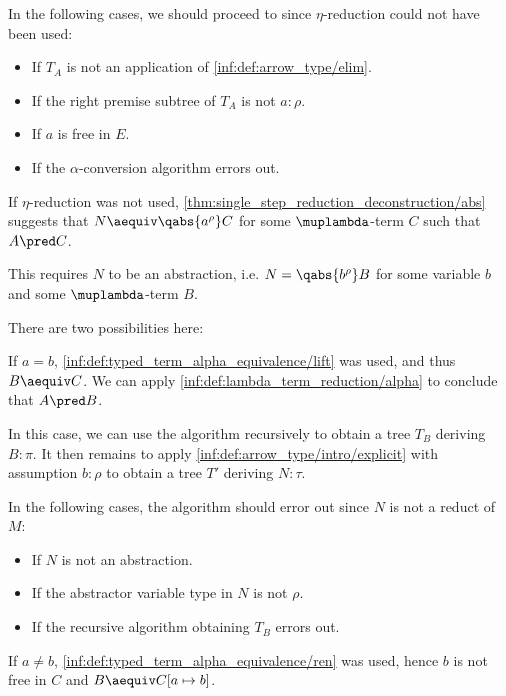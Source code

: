 \begin{algorithm}
\begin{thmenum}
\begin{thmenum}
      In the following cases, we should proceed to  since \( \eta \)-reduction could not have been used:
      \begin{itemize}
        \item If \( T_A \) is not an application of \ref{inf:def:arrow_type/elim}.
        \item If the right premise subtree of \( T_A \) is not \( a: \rho \).
        \item If \( a \) is free in \( E \).
        \item If the \( \alpha \)-conversion algorithm errors out.
      \end{itemize}

       If \( \eta \)-reduction was not used, \cref{thm:single_step_reduction_deconstruction/abs} suggests that \( N \aequiv \qabs {a^\rho} C \) for some \( \muplambda \)-term \( C \) such that \( A \pred C \).

      This requires \( N \) to be an abstraction, i.e. \( N = \qabs {b^\rho} B \) for some variable \( b \) and some \( \muplambda \)-term \( B \).

      There are two possibilities here:
      \begin{thmenum}
         If \( a = b \), \ref{inf:def:typed_term_alpha_equivalence/lift} was used, and thus \( B \aequiv C \). We can apply \ref{inf:def:lambda_term_reduction/alpha} to conclude that \( A \pred B \).

        In this case, we can use the algorithm recursively to obtain a tree \( T_B \) deriving \( B: \pi \). It then remains to apply \ref{inf:def:arrow_type/intro/explicit} with assumption \( b: \rho \) to obtain a tree \( T' \) deriving \( N: \tau \).

        In the following cases, the algorithm should error out since \( N \) is not a reduct of \( M \):
        \begin{itemize}
          \item If \( N \) is not an abstraction.
          \item If the abstractor variable type in \( N \) is not \( \rho \).
          \item If the recursive algorithm obtaining \( T_B \) errors out.
        \end{itemize}

         If \( a \neq b \), \ref{inf:def:typed_term_alpha_equivalence/ren} was used, hence \( b \) is not free in \( C \) and \( B \aequiv C[a \mapsto b] \).


\end{thmenum}
\end{thmenum}
\end{thmenum}
\end{algorithm}
